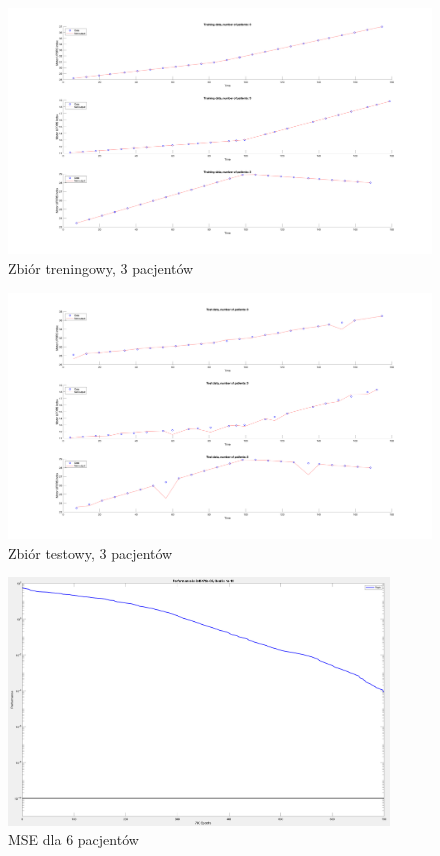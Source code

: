 \documentclass[12pt]{article}
\begin{document}
\begin{figure}[h!]

\includegraphics[width=1.05\textwidth]{training-normal-3.png}
\caption{Zbiór treningowy, 3 pacjentów}

\end{figure}

\begin{figure}[h!]

\includegraphics[width=1.0\textwidth]{test-normal-3.png}
\caption{Zbiór testowy, 3 pacjentów}

\end{figure}

\begin{figure}[h!]

\centering
\includegraphics[width=0.9\textwidth]{mse-normal-6.png}
\caption{MSE dla 6 pacjentów}

\end{figure}
\end{document}
